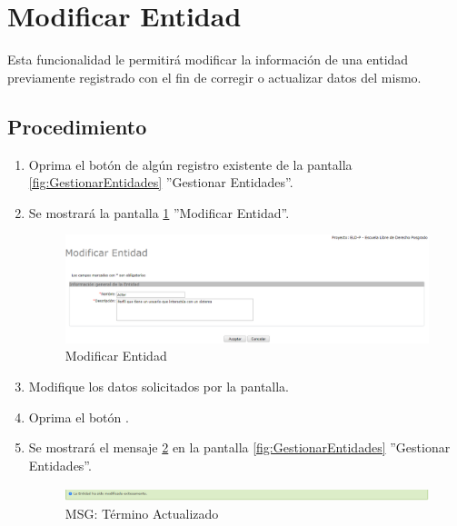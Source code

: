\hypertarget{cv:modificarEntidad}{\section{Modificar Entidad}} \label{sec:modificarEntidad}

	Esta funcionalidad le permitirá modificar la información de una entidad previamente registrado con el fin de corregir o actualizar datos del mismo. 

		\subsection{Procedimiento}

			\begin{enumerate}
	
			\item Oprima el botón \IUEditar{} de algún registro existente de la pantalla \ref{fig:GestionarEntidades} ''Gestionar Entidades''.
	
			\item Se mostrará la pantalla \ref{fig:modificarEntidad} ''Modificar Entidad''.
			
			\begin{figure}[htbp!]
				\begin{center}
					\includegraphics[scale=0.5]{roles/lider/entidades/pantallas/IU12-2modificarEntidad}
					\caption{Modificar Entidad}
					\label{fig:modificarEntidad}
				\end{center}
			\end{figure}
		
			\item Modifique los datos solicitados por la pantalla.
						
			\item Oprima el botón \IUAceptar.
			
			\item Se mostrará el mensaje \ref{fig:entidadModificada} en la pantalla \ref{fig:GestionarEntidades} ''Gestionar Entidades''.
			
			\begin{figure}[htbp!]
				\begin{center}
					\includegraphics[scale=0.5]{roles/lider/entidades/pantallas/IU12-2MSG1}
					\caption{MSG: Término Actualizado}
					\label{fig:entidadModificada}
				\end{center}
			\end{figure}
			\end{enumerate}